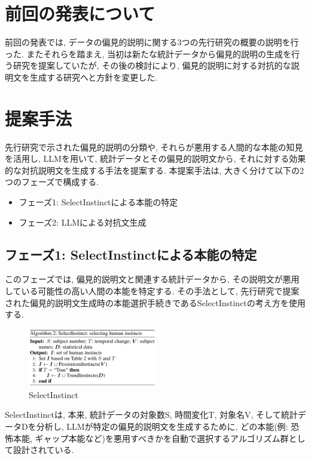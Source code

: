 \documentclass[dvipdfmx]{jsarticle}
\begin{document}
\section{前回の発表について}
前回の発表では, データの偏見的説明に関する3つの先行研究の概要の説明を行った.
またそれらを踏まえ, 当初は新たな統計データから偏見的説明の生成を行う研究を提案していたが,
その後の検討により, 偏見的説明に対する対抗的な説明文を生成する研究へと方針を変更した.

\section{提案手法}

先行研究で示された偏見的説明の分類や, それらが悪用する人間的な本能の知見を活用し, LLMを用いて, 統計データとその偏見的説明文から, それに対する効果的な対抗説明文を生成する手法を提案する.
本提案手法は, 大きく分けて以下の2つのフェーズで構成する.
\begin{itemize}
  \item フェーズ1: SelectInstinctによる本能の特定
  \item フェーズ2: LLMによる対抗文生成
\end{itemize}


\subsection{フェーズ1: SelectInstinctによる本能の特定}
このフェーズでは, 偏見的説明文と関連する統計データから, その説明文が悪用している可能性の高い人間の本能を特定する.
その手法として, 先行研究で提案された偏見的説明文生成時の本能選択手続きであるSelectInstinctの考え方を使用する\cite{anonymous2024}.

\begin{figure}[H]
  \centering
  \includegraphics[width=0.5\textwidth]{01.png}
  \caption{SelectInstinct}
  \label{fig:selectinstinct}
\end{figure}

SelectInstinctは, 本来, 統計データの対象数S, 時間変化T, 対象名V, そして統計データDを分析し,
LLMが特定の偏見的説明文を生成するために, どの本能(例: 恐怖本能, ギャップ本能など)を悪用すべきかを自動で選択するアルゴリズム群として設計されている.
\end{document}
